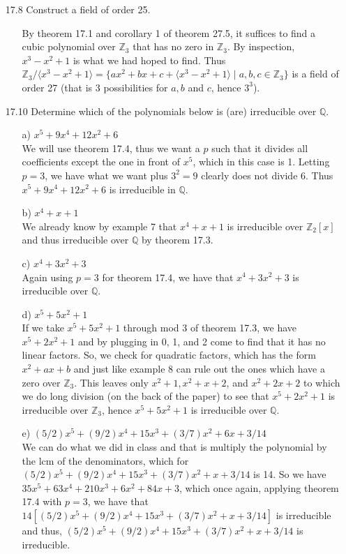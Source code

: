 \documentclass[12pt]{article}
\begin{document}
\begin{enumerate}
\item[17.8] Construct a field of order 25.
\begin{enumerate}
\item[] By theorem 17.1 and corollary 1 of theorem 27.5, it suffices to find a cubic polynomial over $\mathbb{Z}_3$ that has
no zero in $\mathbb{Z}_3$. By inspection, $x^3 - x^2 + 1$ is what we had hoped to find. Thus 
$\mathbb{Z}_3/\langle x^3 - x^2 + 1\rangle = \{ ax^2 + bx + c + \langle x^3 - x^2 + 1\rangle \mid a, b, c \in \mathbb{Z}_3 \}$
is a field of order 27 (that is 3 possibilities for $a, b$ and $c$, hence $3^3$).
\end{enumerate}

\item[17.10] Determine which of the polynomials below is (are) irreducible over $\mathbb{Q}$.
\begin{enumerate}
\item[a)] $x^5 + 9x^4 + 12x^2 + 6$\\
We will use theorem 17.4, thus we want a $p$ such that it divides all coefficients except the
one in front of $x^5$, which in this case is 1. Letting $p = 3$, we have what we want plus $3^2 = 9$
clearly does not divide $6$. Thus $x^5 + 9x^4 + 12x^2 + 6$ is irreducible in $\mathbb{Q}$.
\item[b)] $x^4 + x + 1$\\
We already know by example 7 that $x^4 + x + 1$ is irreducible over $\mathbb{Z}_2[x]$ and
thus irreducible over $\mathbb{Q}$ by theorem 17.3.
\item[c)] $x^4 + 3x^2 + 3$\\
Again using $p = 3$ for theorem 17.4, we have that $x^4 + 3x^2 + 3$ is irreducible over $\mathbb{Q}$.
\item[d)] $x^5 + 5x^2 + 1$\\
If we take $x^5 + 5x^2 + 1$ through mod 3 of theorem 17.3, we have $x^5 + 2x^2 + 1$ and by plugging
in 0, 1, and 2 come to find that it has no linear factors. So, we check for quadratic factors, which
has the form $x^2 + ax + b$ and just like example 8 can rule out the ones which have a zero over 
$\mathbb{Z}_3$. This leaves only $x^2 + 1, x^2 + x + 2$, and $x^2 + 2x + 2$ to which we do long division 
(on the back of the paper) to see that $x^5 + 2x^2 + 1$ is irreducible over $\mathbb{Z}_3$, hence $x^5 + 5x^2 + 1$ is irreducible over $\mathbb{Q}$.
\item[e)] $(5/2)x^5 + (9/2)x^4 + 15x^3 + (3/7)x^2 + 6x + 3/14$\\
We can do what we did in class and that is multiply the polynomial by the lcm of the denominators, which
for $(5/2)x^5 + (9/2)x^4 + 15x^3 + (3/7)x^2 + x + 3/14$ is 14. So we have $35x^5 + 63x^4 + 210x^3 + 6x^2 + 84x + 3$, 
which once again, applying theorem 17.4 with $p = 3$, we have that $14[(5/2)x^5 + (9/2)x^4 + 15x^3 + (3/7)x^2 + x + 3/14]$
is irreducible and thus, $(5/2)x^5 + (9/2)x^4 + 15x^3 + (3/7)x^2 + x + 3/14$ is irreducible.
\end{enumerate}



\end{enumerate}
\end{document}

